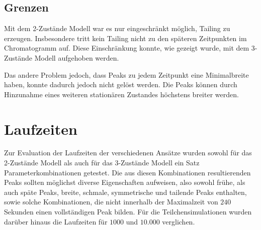 \subsection{Grenzen}

Mit dem 2-Zustände Modell war es nur eingeschränkt möglich, Tailing zu erzeugen. Insbesondere tritt kein Tailing nicht zu den späteren Zeitpunkten im Chromatogramm auf. Diese Einschränkung konnte, wie gezeigt wurde, mit dem 3-Zustände Modell aufgehoben werden. 

Das andere Problem jedoch, dass Peaks zu jedem Zeitpunkt eine Minimalbreite haben, konnte dadurch jedoch nicht gelöst werden. Die Peaks können durch Hinzunahme eines weiteren stationären Zustandes höchstens breiter werden. 

\section{Laufzeiten}

Zur Evaluation der Laufzeiten der verschiedenen Ansätze wurden sowohl für das 2-Zustände Modell als auch für das 3-Zustände Modell ein Satz Parameterkombinationen getestet. Die aus diesen Kombinationen resultierenden Peaks sollten möglichst diverse Eigenschaften aufweisen, also sowohl frühe, als auch späte Peaks, breite, schmale, symmetrische und tailende Peaks enthalten, sowie solche Kombinationen, die nicht innerhalb der Maximalzeit von $240$ Sekunden einen vollständigen Peak bilden.
Für die Teilchensimulationen wurden darüber hinaus die Laufzeiten für $1000$ und $10.000$ verglichen.

 